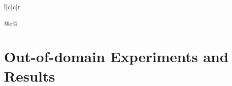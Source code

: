 \documentclass[11pt]{article}
\begin{document}
\begin{table}
{\begin{tabular}{l|c|c|r}
{\begin{tabular}[c]{@{}c@{}}
\begin{table*}
    \centering
    \caption{Comparison of \textsc{SpEL} (with a \textit{fixed candidate set} size of 500k) evaluation results with the literature on out-of-domain datasets. The best score is shown as \textbf{bold} and the second best is shown as \underline{underlined}.\\ \textdagger Results from (\citealp{K18-1050} - Table 2).\\ \ddag The ``Oracle'' results are calculated through feeding the gold annotations of each dataset to GERBIL, and depicts the In-KB annotation quality of each dataset.}
    \label{tab:out_of_domain_experimental_results}
\end{table*}

\section{Out-of-domain Experiments and Results}


\end{tabular}}
\end{tabular}}
\end{table}
\end{document}

